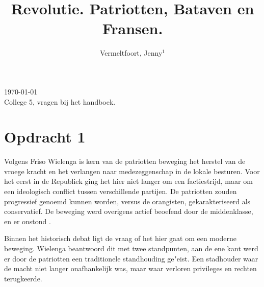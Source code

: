 \documentclass[11pt]{amsart}
\begin{document}
\setcounter{page}{1}

\hfill     {\small \today} \\
{\small College 5, vragen bij het handboek.}\hfill
{\small } %

\centerline{}

\centerline{}

\title[Bataafse Revolutie]{Revolutie. Patriotten, Bataven en Fransen.}

\author[J. Vermeltfoort]{Vermeltfoort, Jenny$^1$}

\address{$^{1}$ 3787494, Faculteit Geesteswetenschappen, Leiden
     Universiteit, Leiden, Nederland.}
\email{\textcolor[rgb]{0.00,0.00,0.84}{j.vermeltfoort@umail.leidenuniv.nl}}



\maketitle

\section*{Opdracht 1}
\label{opdracht1}
Volgens Friso Wielenga is kern van de patriotten beweging het herstel van de vroege kracht en het verlangen naar medezeggenschap in de lokale besturen. \autocite[178]{wielengaGeschiedenisVanNederland2022} Voor het eerst in de Republiek ging het hier niet langer om een factiestrijd, maar om een ideologisch conflict tussen verschillende partijen. \autocite[179]{wielengaGeschiedenisVanNederland2022} De patriotten zouden progressief genoemd kunnen worden, versus de orangisten, gekarakteriseerd als conservatief. De beweging werd overigens actief beoefend door de middenklasse, en er onstond . \autocite{wielengaGeschiedenisVanNederland2022}

Binnen het historisch debat ligt de vraag of het hier gaat om een moderne beweging. Wielenga beantwoord dit met twee standpunten, aan de ene kant werd er door de patriotten een traditionele standhouding ge"eist. \autocite[182]{wielengaGeschiedenisVanNederland2022} Een stadhouder waar de macht niet langer onafhankelijk was, maar waar verloren privileges en rechten terugkeerde. \autocite[182]{wielengaGeschiedenisVanNederland2022} 
\end{document}
